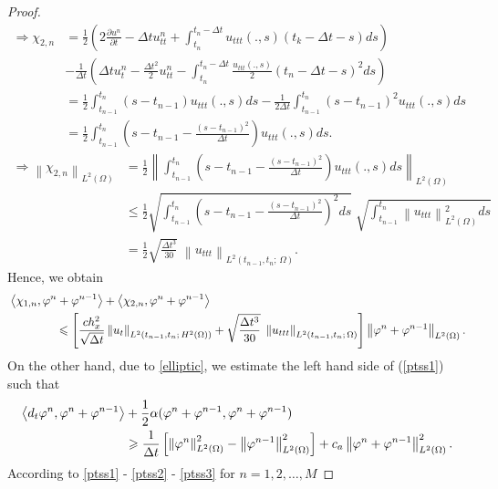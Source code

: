 \documentclass[]{article}
\begin{document}
\begin{proof}
\begin{align*}
		\Rightarrow \chi_{2,n}&=\frac{1}{2}\left(2\frac{\partial u^n}{\partial t}-\Delta tu_{tt}^n+\int_{t_n}^{t_n-\Delta t} u_{ttt}(.,s)(t_k-\Delta t-s)ds\right)\\
		&-\frac{1}{\Delta t}\left(\Delta tu_{t}^n-\frac{\Delta t^2}{2}u_{tt}^n-\int_{t_n}^{t_n-\Delta t} \frac{u_{ttt}(.,s)}{2}(t_n-\Delta t-s)^2ds\right)\\
		&=\frac{1}{2}\int_{t_{n-1}}^{t_n} (s-t_{n-1})u_{ttt}(.,s)ds-\frac{1}{2\Delta t}\int_{t_{n-1}}^{t_n}(s-t_{n-1})^2u_{ttt}(.,s)ds\\
		&=\frac{1}{2}\int_{t_{n-1}}^{t_n}\left(s-t_{n-1}-\frac{(s-t_{n-1})^2}{\Delta t}\right)u_{ttt}(.,s)ds.
	\end{align*}
	\begin{align*}
		\Rightarrow\left\|\chi_{2, n}\right\|_{L^2(\Omega)}&=\frac{1}{2}\left\|\int_{t_{n-1}}^{t_n}\left(s-t_{n-1}-\frac{(s-t_{n-1})^2}{\Delta t}\right)u_{ttt}(.,s)ds\right\|_{L^2(\Omega)}\\
		&\leq\frac{1}{2}\sqrt{\int_{t_{n-1}}^{t_n}\left(s-t_{n-1}-\frac{(s-t_{n-1})^2}{\Delta t}\right)^2ds}\;\sqrt{\int_{t_{n-1}}^{t_n}\left\|u_{ttt}\right\|^2_{L^2(\Omega)}ds }\\
		&=\frac{1}{2}\sqrt{\frac{\Delta t^3}{30}}\;\left\|u_{ttt}\right\|_{L^2(t_{n-1}, t_n;\, \Omega)}.
	\end{align*}
	Hence, we obtain
	\begin{align}\label{ptss2}
		&\left\langle \chi_{1, n}, \varphi^n+\varphi^{n-1}\right\rangle+\left\langle \chi_{2, n}, \varphi^n+\varphi^{n-1}\right\rangle\notag\\
		&\qquad\qquad\leq\left[\frac{ch_x^2}{\sqrt{\Delta t}}\left\|u_t\right\|_{L^2\left(t_{n-1}, t_n;\, H^2(\Omega)\right)}+\sqrt{\frac{\Delta t^3}{30}}\;\left\|u_{ttt}\right\|_{L^2(t_{n-1}, t_n;\, \Omega)}\right]\left\|\varphi^n+\varphi^{n-1}\right\|_{L^2(\Omega)}.
	\end{align} 
	On the other hand, due to \eqref{elliptic}, we estimate the left hand side of  (\ref{ptss1}) such that
	\begin{align}\label{ptss3}
		\left\langle d_t\varphi^n, \varphi^n+\varphi^{n-1}\right\rangle &+\frac{1}{2}\alpha(\varphi^n+\varphi^{n-1}, \varphi^n+\varphi^{n-1})\notag\\
		&\geq\frac{1}{\Delta t}\left[\left\|\varphi^n\right\|^2_{L^2(\Omega)}-\left\|\varphi^{n-1}\right\|^2_{L^2(\Omega)}\right]+c_a\left\|\varphi^n+\varphi^{n-1}\right\|^2_{L^2(\Omega)}.
	\end{align}
	According to \eqref{ptss1} - \eqref{ptss2} - \eqref{ptss3} for $n=1, 2,\dots, M$ 

\end{proof}
\end{document}
